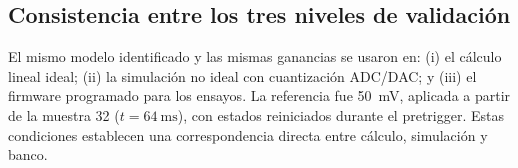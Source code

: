 \subsection{Consistencia entre los tres niveles de validación}
El mismo modelo identificado y las mismas ganancias se usaron en: (i) el
cálculo lineal ideal; (ii) la simulación no ideal con cuantización ADC/DAC; y
(iii) el firmware programado para los ensayos. La referencia fue
\SI{50}{\milli\volt}, aplicada a partir de la muestra 32
($t=\SI{64}{\milli\second}$), con estados reiniciados durante el pretrigger.
Estas condiciones establecen una correspondencia directa entre cálculo,
simulación y banco.
